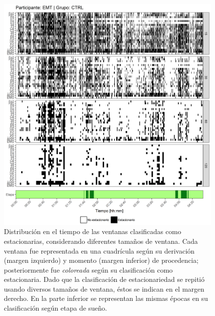 \begin{figure}
\centering
\includegraphics[width=\linewidth]
{./scripts_graf_res/EMT_patrones_2.png}
\caption[Distribución en el tiempo de las ventanas clasificadas como estacionarias, considerando diferentes tamaños de ventana]{Distribución en el tiempo de las ventanas clasificadas como estacionarias, considerando diferentes tamaños de ventana. 
Cada ventana fue representada en una cuadrícula según su derivación (margen izquierdo) y momento (margen inferior) de procedencia; posteriormente fue \textit{coloreada} según su clasificación como estacionaria.
Dado que la clasificación de estacionariedad se repitió usando diversos tamaños de ventana, éstos se indican en el margen derecho.
En la parte inferior se representan las mismas épocas en su clasificación según etapa de sueño.}
\end{figure}


